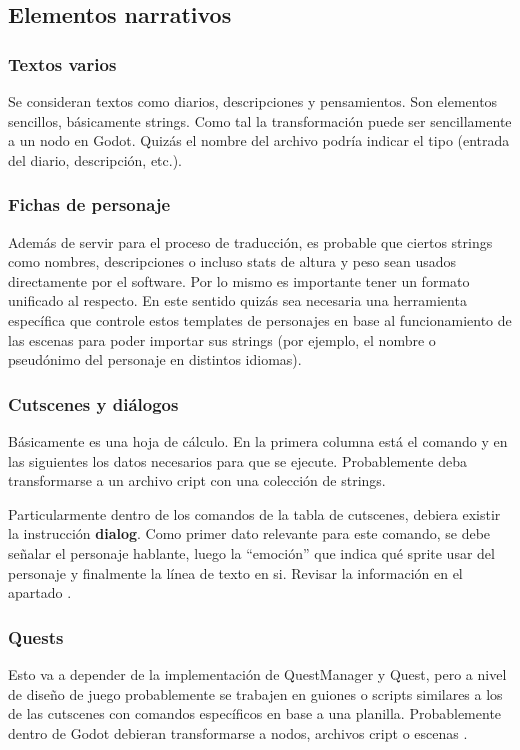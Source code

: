 \subsection{Elementos narrativos}\label{kit:elementos-narrativos}

\subsubsection{Textos varios}\label{kit:textos-varios}
Se consideran textos como diarios, descripciones y pensamientos. Son elementos sencillos, básicamente strings. Como tal la transformación puede ser sencillamente a un nodo en Godot. Quizás el nombre del archivo podría indicar el tipo (entrada del diario, descripción, etc.). 

\subsubsection{Fichas de personaje}\label{kit:fichas-de-personaje}
Además de servir para el proceso de traducción, es probable que ciertos strings como nombres, descripciones o incluso stats de altura y peso sean usados directamente por el software. Por lo mismo es importante tener un formato unificado al respecto. En este sentido quizás sea necesaria una herramienta específica que controle estos templates de personajes en base al funcionamiento de las escenas para poder importar sus strings (por ejemplo, el nombre o pseudónimo del personaje en distintos idiomas).

\subsubsection{Cutscenes y diálogos}\label{kit:cutscenes-y-dialogos}
Básicamente es una hoja de cálculo. En la primera columna está el comando y en las siguientes los datos necesarios para que se ejecute. Probablemente deba transformarse a un archivo cript con una colección de strings.

Particularmente dentro de los comandos de la tabla de cutscenes, debiera existir la instrucción \textbf{dialog}. Como primer dato relevante para este comando, se debe señalar el personaje hablante, luego la “emoción” que indica qué sprite usar del personaje y finalmente la línea de texto en si. Revisar la información en el apartado .

\subsubsection{Quests}\label{kit:quests}
Esto va a depender de la implementación de QuestManager y Quest, pero a nivel de diseño de juego probablemente se trabajen en guiones o scripts similares a los de las cutscenes con comandos específicos en base a una planilla. Probablemente dentro de Godot debieran transformarse a nodos, archivos cript o escenas .

